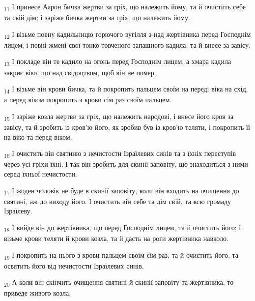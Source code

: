 \begin{tcolorbox}
\textsubscript{11} І принесе Аарон бичка жертви за гріх, що належить йому, та й очистить себе та свій дім; і заріже бичка жертви за гріх, що належить йому.
\end{tcolorbox}
\begin{tcolorbox}
\textsubscript{12} І візьме повну кадильницю горючого вугілля з-над жертівника перед Господнім лицем, і повні жмені свої тонко товченого запашного кадила, та й внесе за завісу.
\end{tcolorbox}
\begin{tcolorbox}
\textsubscript{13} І покладе він те кадило на огонь перед Господнім лицем, а хмара кадила закриє віко, що над свідоцтвом, щоб він не помер.
\end{tcolorbox}
\begin{tcolorbox}
\textsubscript{14} І візьме він крови бичка, та й покропить пальцем своїм на переді віка на схід, а перед віком покропить з крови сім раз своїм пальцем.
\end{tcolorbox}
\begin{tcolorbox}
\textsubscript{15} І заріже козла жертви за гріх, що належить народові, і внесе його кров за завісу, та й зробить із кров'ю його, як зробив був із кров'ю теляти, і покропить її на віко та перед віком.
\end{tcolorbox}
\begin{tcolorbox}
\textsubscript{16} І очистить він святиню з нечистости Ізраїлевих синів та з їхніх переступів через усі гріхи їхні. І так він зробить для скинії заповіту, що знаходиться з ними серед їхньої нечистости.
\end{tcolorbox}
\begin{tcolorbox}
\textsubscript{17} І жоден чоловік не буде в скинії заповіту, коли він входить на очищення до святині, аж до виходу його. І очистить він себе та дім свій, та всю громаду Ізраїлеву.
\end{tcolorbox}
\begin{tcolorbox}
\textsubscript{18} І вийде він до жертівника, що перед Господнім лицем, та й очистить його; і візьме крови теляти й крови козла, та й дасть на роги жертівника навколо.
\end{tcolorbox}
\begin{tcolorbox}
\textsubscript{19} І покропить на нього з крови пальцем своїм сім раз, та й очистить його, та освятить його від нечистости Ізраїлевих синів.
\end{tcolorbox}
\begin{tcolorbox}
\textsubscript{20} А коли він скінчить очищення святині й скинії заповіту та жертівника, то приведе живого козла.
\end{tcolorbox}
